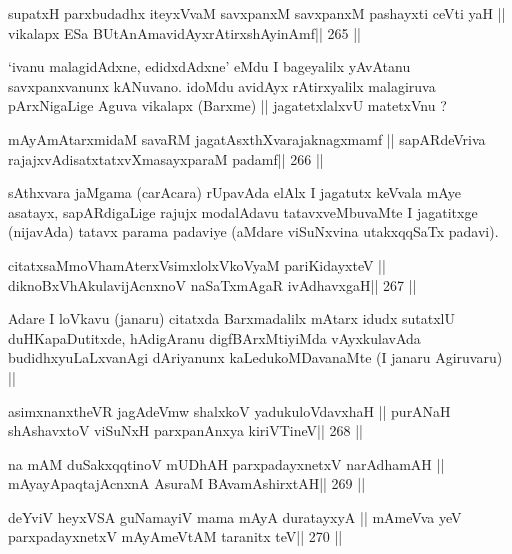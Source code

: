 \begin{shl}
supatxH parxbudadhx iteyxVvaM savxpanxM savxpanxM pashayxti ceVti yaH ||
vikalapx ESa BUtAnAmavidAyxrAtirxshAyinAmf\hfill || 265 ||
\end{shl}

\begin{artha}
`ivanu malagidAdxne, edidxdAdxne' eMdu I bageyalilx yAvAtanu savxpanxvanunx kANuvano. idoMdu avidAyx rAtirxyalilx malagiruva pArxNigaLige Aguva vikalapx (Barxme) || jagatetxlalxvU matetxVnu ?
\end{artha}

\begin{shl}
mAyAmAtarxmidaM savaRM jagatAsxthXvarajaknagxmamf ||
sapARdeVriva rajajxvAdisatxtatxvXmasayxparaM padamf\hfill || 266 ||
\end{shl}

\begin{artha}
sAthxvara jaMgama (carAcara) rUpavAda elAlx I jagatutx keVvala mAye asatayx, sapARdigaLige rajujx modalAdavu tatavxveMbuvaMte I jagatitxge (nijavAda) tatavx parama padaviye (aMdare viSuNxvina utakxqqSaTx padavi).
\end{artha}

\begin{shl}
citatxsaMmoVhamAterxVsimxlolxVkoV\s yaM pariKidayxteV ||
diknoBxVhAkulavijAcnxnoV naSaTxmAgaR ivAdhavxgaH\hfill || 267 ||
\end{shl}

\begin{artha}
Adare I loVkavu (janaru) citatxda Barxmadalilx mAtarx idudx sutatxlU duHKapaDutitxde, hAdigAranu digfBArxMtiyiMda vAyxkulavAda budidhxyuLaLxvanAgi dAriyanunx kaLedukoMDavanaMte (I janaru Agiruvaru) ||
\end{artha}

\begin{shl}
asimxnanxtheVR jagAdeVmw shalxkoV yadukuloVdavxhaH ||
purANaH shAshavxtoV viSuNxH parxpanAnxya kiriVTineV\hfill || 268 ||
\end{shl}

\begin{shl}
na mAM duSakxqqtinoV mUDhAH parxpadayxnetxV narAdhamAH ||
mAyayA\s paqtajAcnxnA AsuraM BAvamAshirxtAH\hfill || 269 ||
\end{shl}

\begin{shl}
deYviV heyxVSA guNamayiV mama mAyA duratayxyA ||
mAmeVva yeV parxpadayxnetxV mAyAmeVtAM taranitx teV\hfill || 270 ||
\end{shl}

